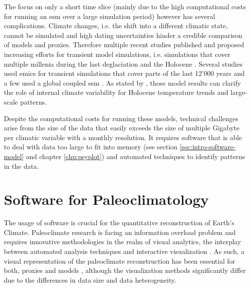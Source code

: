\begin{refsection}
The focus on only a short time slice (mainly due to the high computational costs for running an \gls{esm} over a large simulation period) however has several complications. Climate changes, i.e. the shift into a different climatic state, cannot be simulated and high dating uncertainties hinder a credible comparison of models and proxies\addref. Therefore multiple recent studies published and proposed increasing efforts for transient model simulations, i.e. simulations that cover multiple millenia during the last deglaciation \citep{IvanovicGregoireKageyamaEtAl2016} and the Holocene \citep{Otto-BliesnerBraconnotHarrisonEtAl2017}. Several studies used \glspl{emic} for transient simulations that cover parts of the last 12'000 years \citep[e.g.][]{RocheRenssenPaillardEtAl2011, MenvielTimmermannTimmEtAl2011, GregoireValdesPayne2015} and a few used a global coupled \gls{esm} \citep{VarmaPrangeMerkelEtAl2012, OttoBliesnerRussellClarkEtAl2014}. As stated by \cite{WeitzelWagnerSjolteEtAl2019}, those model results can clarify the role of internal climate variability for Holocene temperature trends and large-scale patterns.

Despite the computational costs for running these models, technical challenges arise from the size of the data that easily exceeds the size of multiple Gigabyte per climatic variable with a monthly resolution. It requires software that is able to deal with data too large to fit into memory (see section \ref{sec:intro-software-model} and chapter \ref{chp:psyplot}) and automated techniques to identify patterns in the data.



\section{Software for Paleoclimatology} \label{sec:intro-software}

The usage of software is crucial for the quantitative reconstruction of Earth's Climate. Paleoclimate research is facing an information overload problem and requires innovative methodologies in the realm of visual analytics, the interplay between automated analysis techniques and interactive visualization \citep{KeimAndrienkoFeketeEtAl2008, Nocke2014}. As such, a visual representation of the paleoclimate reconstruction has been essential for both, proxies \citep{Nichols1967, Bradley1985, Grimm1988} and models \citep{Phillips1956, RautenhausBoettingerSiemenEtAl2018, NockeSterzelBoettingerEtAl2008, Nocke2014, BoettingerRoeber2019}, although the visualization methods significantly differ due to the differences in data size and data heterogeneity.


\end{refsection}
